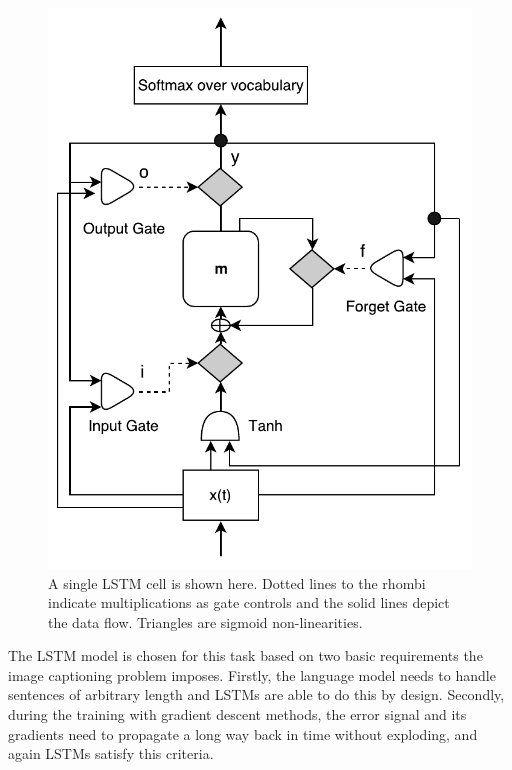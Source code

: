 \begin{figure}[h]
  \begin{center}
    \includegraphics[width=0.5\linewidth]{images/LstmBlockDiag.pdf}
  \end{center}
  \vspace*{-6mm}
  \caption{A single LSTM cell is shown here. Dotted lines
    to the rhombi indicate multiplications as gate controls and the
    solid lines depict the data flow. Triangles are sigmoid
    non-linearities.}
  \label{fig:lstmcell}
\end{figure}

The LSTM model is chosen for this task based on two basic requirements the image
captioning problem imposes. 
Firstly, the language model needs to handle sentences of arbitrary length and
LSTMs are able to do this by design.
Secondly, during the training with gradient descent methods, the error signal
and its gradients need to propagate a long way back in time without exploding,
and again LSTMs satisfy this criteria.


